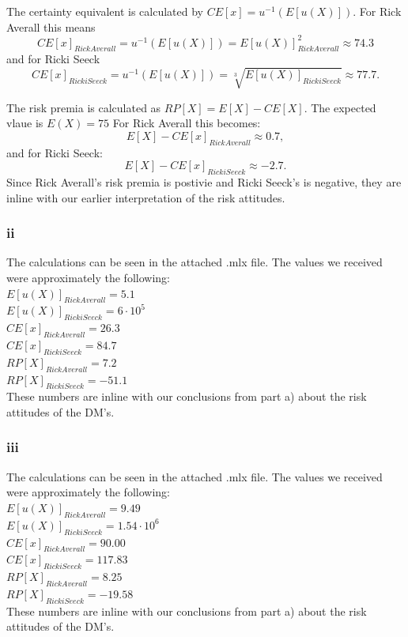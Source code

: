 \documentclass{article}
\begin{document}
	The certainty equivalent is calculated by $CE[x] = u^{-1}(E[u(X)])$. For Rick Averall this means
	\begin{equation}
		CE[x]_{Rick Averall} = u^{-1}(E[u(X)]) = E[u(X)]_{Rick Averall}^2 \approx 74.3
	\end{equation}
	and for Ricki Seeck 
		\begin{equation}
		CE[x]_{Ricki Seeck} = u^{-1}(E[u(X)]) = \sqrt[3]{E[u(X)]_{Ricki Seeck}} \approx 77.7.
	\end{equation}

	The risk premia is calculated as $RP[X] = E[X] - CE[X]$. The expected vlaue is $E(X) = 75$ 
	For Rick Averall this becomes:
	\begin{equation}
		E[X] - CE[x]_{Rick Averall} \approx 0.7,
	\end{equation}
	and for Ricki Seeck:
		\begin{equation}
		E[X] - CE[x]_{Ricki Seeck} \approx -2.7.
	\end{equation}
	Since Rick Averall's risk premia is postivie and Ricki Seeck's is negative, they are inline with our earlier interpretation of the risk attitudes.
\subsubsection{ii}
	The calculations can be seen in the attached .mlx file. The values we received were approximately the following:\\
	$E[u(X)]_{Rick Averall} = 5.1$ \\
	$E[u(X)]_{Ricki Seeck} = 6\cdot10^5$\\
	$CE[x]_{Rick Averall} = 26.3 $ \\
	$CE[x]_{Ricki Seeck} = 84.7$ \\
	$RP[X]_{Rick Averall} = 7.2$ \\
	$RP[X]_{Ricki Seeck} = -51.1$ \\
	These numbers are inline with our conclusions from part a) about the risk attitudes of the DM's.
\subsubsection{iii}
	The calculations can be seen in the attached .mlx file. The values we received were approximately the following:\\
	$E[u(X)]_{Rick Averall} = 9.49$ \\
	$E[u(X)]_{Ricki Seeck} = 1.54\cdot10^6$\\
	$CE[x]_{Rick Averall} = 90.00 $ \\
	$CE[x]_{Ricki Seeck} = 117.83$ \\
	$RP[X]_{Rick Averall} = 8.25$ \\
	$RP[X]_{Ricki Seeck} = -19.58$ \\
	These numbers are inline with our conclusions from part a) about the risk attitudes of the DM's.
\end{document}
